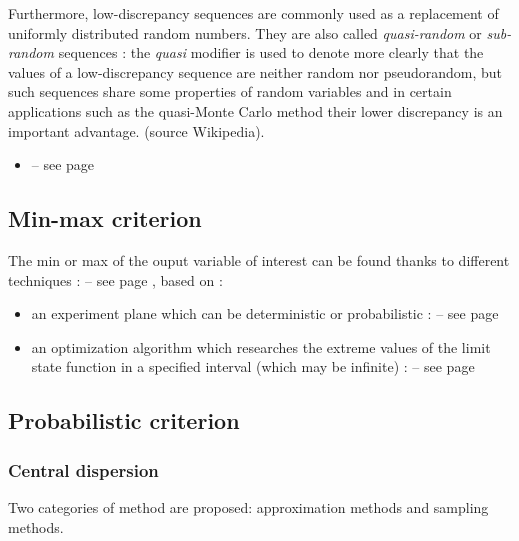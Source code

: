 Furthermore,  low-discrepancy sequences are commonly used as a replacement of uniformly distributed random numbers. They are also called  \emph{quasi-random} or  \emph{sub-random} sequences : the \emph{quasi} modifier is used to denote more clearly that the values of a low-discrepancy sequence are neither random nor pseudorandom, but such sequences share some properties of random variables and in certain applications such as the quasi-Monte Carlo method their lower discrepancy is an important advantage. (source Wikipedia).

\begin{itemize}
\item {} -- see page \pageref{docref_C_LowDiscrepancySequence} \vspace{2mm}
\end{itemize}


\subsection{Min-max criterion}

The min or max of the ouput variable of interest can be found thanks to different techniques :  -- see page \pageref{docref_C11_MinMax}, based on :

\begin{itemize}
\item an  experiment plane which can be deterministic or probabilistic :  -- see page \pageref{docref_C11_ExperimentPlanes}
\item an optimization algorithm which researches the extreme values of the limit state function in a specified interval (which may be infinite) :  -- see page \pageref{docref_C11_OptimizationAlgo}

\end{itemize}

\subsection{Probabilistic criterion}

\subsubsection{Central dispersion}

Two categories of method are proposed: approximation methods and sampling methods.

